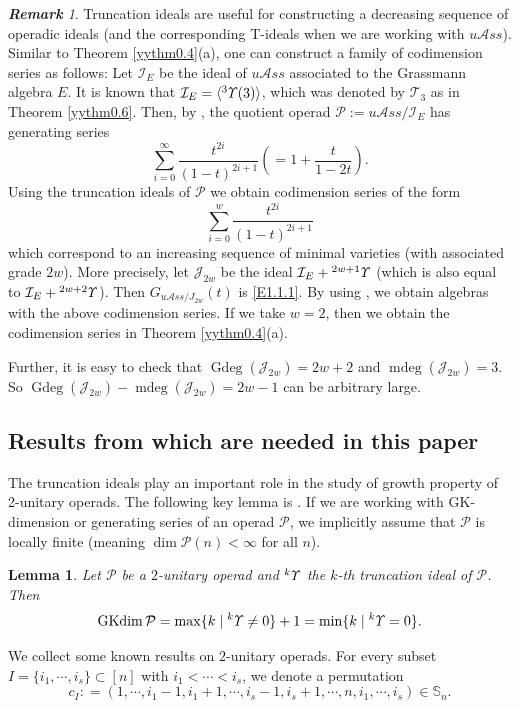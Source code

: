 \documentclass{amsart}
\newtheorem{lem}[thm]{Lemma}
\theoremstyle{definition}
\theoremstyle{remark}
\newtheorem{rmk}[thm]{\bf Remark}
\numberwithin{equation}{section}
\def\S{\mathbb{S}}
\def\gd{\operatorname{Gdeg}}
\def\mdeg{\operatorname{mdeg}}
\newcommand{\lr}[1]{\langle #1 \rangle}
\newcommand{\up}[1]{{^{#1}{\it \!\Upsilon}}}
\def \uas{u\mathcal{A}ss}
\def \I{\mathcal{I}}
\def \J{\mathcal{J}}
\def \ip{{\mathcal{P}}}
\def \dim{\operatorname{dim}}
\def\gkdim{\operatorname{GKdim}}
\def \S{\mathbb{S}}
\def\T{\mathcal{T}}
\begin{document}
\begin{rmk}
\label{yyrem1.1}
Truncation ideals are useful for constructing a decreasing
sequence of operadic ideals (and the corresponding T-ideals 
when we are working with $\uas$). Similar to Theorem 
\ref{yythm0.4}(a), one can construct a family of codimension 
series as follows: Let $\I_{E}$ be the ideal of 
$\uas$ associated to the Grassmann algebra $E$. It is known
that $\I_{E}=\lr{\up{3}(3)}$, which was denoted by $\T_3$ as 
in Theorem \ref{yythm0.6}. Then, by 
\cite[Remark, p.235]{DrR}, the quotient operad 
$\ip:=\uas/\I_E$ has generating series
$$\sum_{i=0}^{\infty} \frac{t^{2i}}{(1-t)^{2i+1}} 
(=1+\frac{t}{1-2t}).$$
Using the truncation ideals of $\ip$ we obtain codimension 
series of the form
\begin{equation}
\label{E1.1.1}\tag{E1.1.1}
\sum_{i=0}^{w} \frac{t^{2i}}{(1-t)^{2i+1}}
\end{equation}
which correspond to an increasing sequence of minimal 
varieties (with associated grade $2w$). More precisely, 
let $\J_{2w}$ be the ideal $\I_{E}+\up{2w+1}$
(which is also equal to $\I_{E}+\up{2w+2}$). Then 
$G_{\uas/J_{2w}}(t)$ is \eqref{E1.1.1}. By using 
\cite[Theorem 0.2]{BXYZZ}, we obtain algebras with the above 
codimension series. If we take $w=2$, then we obtain the 
codimension series in Theorem \ref{yythm0.4}(a).

Further, it is easy to check that $\gd(\J_{2w})=2w+2$
and $\mdeg(\J_{2w})=3$. So $\gd(\J_{2w})-\mdeg(\J_{2w})
=2w-1$ can be arbitrary large.
\end{rmk}

\subsection{Results from \cite{BYZ} which are needed in this paper}
\label{yysec1.6}
The truncation ideals play an important role in the study of 
growth property of 2-unitary operads. The following key 
lemma is \cite[Theorem 0.1(2)]{BYZ}. If we are working 
with GK-dimension or generating series of an operad $\ip$,
we implicitly assume that $\ip$ is locally finite
(meaning $\dim \ip(n)<\infty$ for all $n$).

\begin{lem}
\label{yylem1.2}
Let $\ip$ be a $2$-unitary operad and $\up{k}$ the $k$-th 
truncation ideal of $\ip$. Then
\[\gkdim \ip=\max\{k\mid \up{k}\neq 0\}+1 
=\min\{k\mid \up{k}=0\}.\]
\end{lem}

We collect some known results on $2$-unitary operads. For 
every subset $I=\{i_1, \cdots, i_s\}\subset [n]$ with 
$i_1<\cdots<i_s$, we denote a permutation
\[c_I\colon=(1, \cdots, i_1-1, i_1+1, 
\cdots, i_s-1, i_s+1, \cdots, n, i_1, \cdots, i_s)\in \S_n.\]
\end{document}
